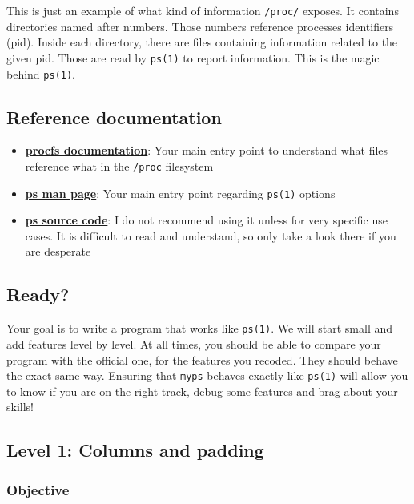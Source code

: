 \documentclass[12pt]{article}
\let\oldhref\href
\renewcommand{\href}[2]{\oldhref{#1}{\bfseries#2}}
\begin{document}
This is just an example of what kind of information \texttt{/proc/} exposes. It contains directories named after numbers. Those numbers reference processes identifiers (pid). Inside each directory, there are files containing information related to the given pid. Those are read by \texttt{ps(1)} to report information. This is the magic behind \texttt{ps(1)}.

\subsection{Reference documentation}

\begin{itemize}
	\item \href{https://man7.org/linux/man-pages/man5/procfs.5.html}{procfs documentation}: Your main entry point to understand what files reference what in the \texttt{/proc} filesystem
	\item \href{https://man7.org/linux/man-pages/man1/ps.1.html}{ps man page}: Your main entry point regarding \texttt{ps(1)} options
	\item \href{https://gitlab.com/procps-ng/procps/-/blob/master/ps/}{ps source code}: I do not recommend using it unless for very specific use cases. It is difficult to read and understand, so only take a look there if you are desperate
\end{itemize}

\subsection{Ready?}

Your goal is to write a program that works like \texttt{ps(1)}. We will start small and add features level by level. At all times, you should be able to compare your program with the official one, for the features you recoded. They should behave the exact same way. Ensuring that \texttt{myps} behaves exactly like \texttt{ps(1)} will allow you to know if you are on the right track, debug some features and brag about your skills!

\subsection{Level 1: Columns and padding}

\subsubsection{Objective}
\end{document}
